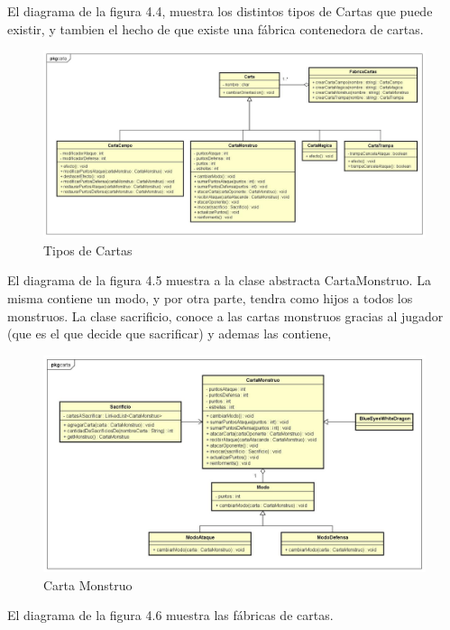 El diagrama de la figura 4.4, muestra los distintos tipos de Cartas que puede existir, y tambien el hecho de que existe una fábrica contenedora de cartas.

\begin{figure}[H]
	\centering
	\includegraphics[scale=0.3]{includes/Carta2}
	\caption{Tipos de Cartas}
	\label{TiposCarta}
\end{figure}

El diagrama de la figura 4.5 muestra a la clase abstracta CartaMonstruo. La misma contiene un modo, y por otra parte, tendra como hijos a todos los monstruos. La clase sacrificio, conoce a las cartas monstruos gracias al jugador (que es el que decide que sacrificar) y ademas las contiene, 


\begin{figure}[H]
	\centering
	\includegraphics[scale=0.3]{includes/CartaMonstruo}
	\caption{Carta Monstruo}
	\label{CartaMonstruo}
\end{figure}

El diagrama de la figura 4.6 muestra las fábricas de cartas.

